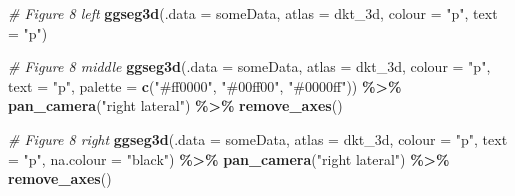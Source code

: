 \documentclass[fleqn,10pt]{wlpeerj} %
\newenvironment{Shaded}{\begin{snugshade}}{\end{snugshade}}
\newcommand{\CommentTok}[1]{\textcolor[rgb]{0.56,0.35,0.01}{\textit{#1}}}
\newcommand{\DataTypeTok}[1]{\textcolor[rgb]{0.13,0.29,0.53}{#1}}
\newcommand{\KeywordTok}[1]{\textcolor[rgb]{0.13,0.29,0.53}{\textbf{#1}}}
\newcommand{\NormalTok}[1]{#1}
\newcommand{\OperatorTok}[1]{\textcolor[rgb]{0.81,0.36,0.00}{\textbf{#1}}}
\newcommand{\StringTok}[1]{\textcolor[rgb]{0.31,0.60,0.02}{#1}}
\begin{document}
\begin{Shaded}
\begin{Highlighting}[]
\CommentTok{\# Figure 8 left}
\KeywordTok{ggseg3d}\NormalTok{(}\DataTypeTok{.data =}\NormalTok{ someData, }\DataTypeTok{atlas =}\NormalTok{ dkt\_3d, }\DataTypeTok{colour =} \StringTok{"p"}\NormalTok{, }\DataTypeTok{text =} \StringTok{"p"}\NormalTok{)}

\CommentTok{\# Figure 8 middle}
\KeywordTok{ggseg3d}\NormalTok{(}\DataTypeTok{.data =}\NormalTok{ someData,}
        \DataTypeTok{atlas =}\NormalTok{ dkt\_3d,}
        \DataTypeTok{colour =} \StringTok{"p"}\NormalTok{, }\DataTypeTok{text =} \StringTok{"p"}\NormalTok{,}
        \DataTypeTok{palette =} \KeywordTok{c}\NormalTok{(}\StringTok{"\#ff0000"}\NormalTok{, }\StringTok{"\#00ff00"}\NormalTok{, }\StringTok{"\#0000ff"}\NormalTok{)) }\OperatorTok{\%>\%}
\StringTok{  }\KeywordTok{pan\_camera}\NormalTok{(}\StringTok{"right lateral"}\NormalTok{) }\OperatorTok{\%>\%}
\StringTok{  }\KeywordTok{remove\_axes}\NormalTok{()}

\CommentTok{\# Figure 8 right}
\KeywordTok{ggseg3d}\NormalTok{(}\DataTypeTok{.data =}\NormalTok{ someData,}
        \DataTypeTok{atlas =}\NormalTok{ dkt\_3d,}
        \DataTypeTok{colour =} \StringTok{"p"}\NormalTok{, }\DataTypeTok{text =} \StringTok{"p"}\NormalTok{,}
        \DataTypeTok{na.colour =} \StringTok{"black"}\NormalTok{) }\OperatorTok{\%>\%}
\StringTok{  }\KeywordTok{pan\_camera}\NormalTok{(}\StringTok{"right lateral"}\NormalTok{) }\OperatorTok{\%>\%}
\StringTok{  }\KeywordTok{remove\_axes}\NormalTok{()}
\end{Highlighting}
\end{Shaded}
\end{document}
